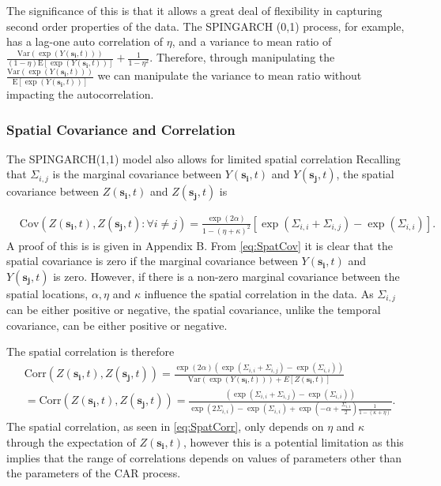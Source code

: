 \documentclass[11pt]{isuthesis}
\begin{document}
The significance of this is that it allows a great deal of flexibility in capturing second order properties of the data.  The SPINGARCH (0,1) process, for example, has a lag-one auto correlation of $\eta$, and a variance to mean ratio of $\frac{\mbox{Var} \left(\exp(Y(\boldsymbol{s_i},t))
	\right)}{(1-\eta) \mbox{E}\left[\exp(Y(\boldsymbol{s_i},t))\right]} + \frac{1}{1-\eta^2}$.  Therefore, through manipulating the $\frac{ \mbox{Var} \left(\exp(Y(\boldsymbol{s_i},t))\right)}{ \mbox{E}\left[\exp(Y(\boldsymbol{s_i},t))\right]}$ we can manipulate the variance to mean ratio without impacting the autocorrelation.


\subsubsection{Spatial Covariance and Correlation}
The SPINGARCH(1,1) model also allows for limited spatial correlation Recalling that $\Sigma_{i,j}$ is the marginal covariance between $Y(\boldsymbol{s_i},t)$ and $Y(\boldsymbol{s_j},t)$, the spatial covariance between $Z(\boldsymbol{s_i},t)$ and $Z(\boldsymbol{s_j},t)$ is

\begin{align}
	& \mbox{Cov}(Z(\boldsymbol{s_i},t),Z(\boldsymbol{s_j},t):\forall i \neq j) =  \frac{\exp(2\alpha)}{1-(\eta+\kappa)^2}\left[\exp(\Sigma_{i,i}+\Sigma_{i,j}) -\exp(\Sigma_{i,i})\right] \label{eq:SpatCov}.
\end{align}
A proof of this is is given in Appendix B.  From \eqref{eq:SpatCov} it is clear that the spatial covariance is zero if the marginal covariance between $Y(\boldsymbol{s_i},t)$ and $Y(\boldsymbol{s_j},t)$ is zero.  However, if there is a non-zero marginal covariance between the spatial locations, $\alpha,\eta$ and $\kappa$ influence the spatial correlation in the data. As $\Sigma_{i,j}$ can be either positive or negative, the spatial covariance, unlike the temporal covariance, can be either positive or negative.

The spatial correlation is therefore
\begin{align}
	& \mbox{Corr}(Z(\boldsymbol{s_i},t),Z(\boldsymbol{s_j},t))  = \frac{\exp(2\alpha)\left(\exp(\Sigma_{i,i}+\Sigma_{i,j}) -\exp(\Sigma_{i,i})\right)}{\mbox{Var} (\exp(Y(\boldsymbol{s_i},t)))+E[Z(\boldsymbol{s_i},t)]}\nonumber \\
	&=\mbox{Corr}(Z(\boldsymbol{s_i},t),Z(\boldsymbol{s_j},t))  = \frac{\left(\exp(\Sigma_{i,i}+\Sigma_{i,j}) -\exp(\Sigma_{i,i})\right)}{ \exp(2\Sigma_{i,i})-\exp(\Sigma_{i,i})+\exp(-\alpha+\frac{\Sigma_{i,i}}{2})\frac{1}{1-(\kappa+\eta)}}\label{eq:SpatCorr}.
\end{align}
The spatial correlation, as seen in \eqref{eq:SpatCorr}, only depends on $\eta$ and $\kappa$ through the expectation of $Z(\boldsymbol{s_i},t)$, however this is a potential limitation as this implies that the range of correlations depends on values of parameters other than the parameters of the CAR process.
\end{document}
